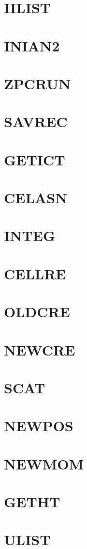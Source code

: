 \documentclass[14pt,UTF8]{ctexbook}
\begin{document}
\section{IILIST}
\section{INIAN2}
\section{ZPCRUN}
\section{SAVREC}
\section{GETICT}
\section{CELASN}
\section{INTEG}
\section{CELLRE}
\section{OLDCRE}
\section{NEWCRE}
\section{SCAT}
\section{NEWPOS}
\section{NEWMOM}
\section{GETHT}
\section{ULIST}
\end{document}
